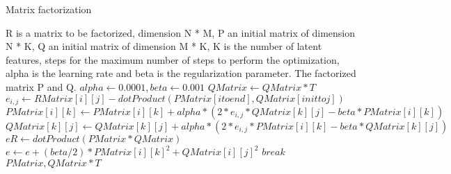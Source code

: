 \begin{algorithm}
\caption{Matrix factorization}
\begin{algorithmic}
\REQUIRE R is a matrix to be factorized, dimension N * M, P an initial matrix of dimension N * K, Q an initial matrix of dimension M * K, K is the number of latent features, steps for the maximum number of steps to perform the optimization,  alpha is the learning rate and  beta  is the regularization parameter.
\ENSURE The factorized matrix P and Q.
\STATE $alpha \leftarrow 0.0001, beta \leftarrow 0.001$ 
\STATE $QMatrix \leftarrow QMatrix * T $ 
\STATE $e_{i,j} \leftarrow RMatrix[i][j]-dotProduct(PMatrix[i to end],QMatrix[init to j])$
\ENDIF
{}
\STATE $PMatrix[i][k] \leftarrow PMatrix[i][k]+alpha * (2*e_{i,j}*QMatrix[k][j] - beta *PMatrix[i][k])$
\STATE $QMatrix[k][j] \leftarrow QMatrix[k][j]+alpha * (2*e_{i,j}*PMatrix[i][k] - beta *QMatrix[k][j])$
\ENDFOR
\ENDFOR
\ENDFOR
\STATE $eR \leftarrow dotProduct (PMatrix * QMatrix)$
\STATE $e \leftarrow e + (beta/2) * PMatrix[i][k]^2 + QMatrix[i][j]^2$
\ENDIF
\ENDFOR
\ENDFOR
{}
\STATE $break$
\ENDIF
\ENDFOR
\RETURN $PMatrix, QMatrix * T$ 
\end{algorithmic}
\end{algorithm}

